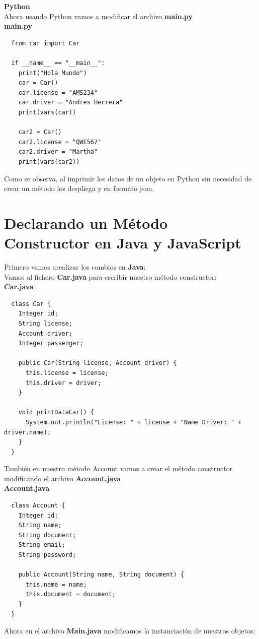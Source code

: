 \documentclass{article}
\begin{document}
\textbf{Python}\\
Ahora usando Python vamos a modificar el archivo \textbf{main.py}\\

\textbf{main.py}
\begin{verbatim}
  from car import Car

  if __name__ == "__main__":
    print("Hola Mundo")
    car = Car()
    car.license = "AMS234"
    car.driver = "Andres Herrera"
    print(vars(car))

    car2 = Car()
    car2.license = "QWE567"
    car2.driver = "Martha"
    print(vars(car2))
\end{verbatim}
Como se observa, al imprimir los datos de un objeto en Python sin necesidad de
crear un método los despliega y en formato json.


\section{Declarando un Método Constructor en Java y JavaScript}%
Primero vamos arealizar los cambios en \textbf{Java}:\\
Vamos al fichero \textbf{Car.java} para escribir nuestro método constructor:\\

\textbf{Car.java}
\begin{verbatim}
  class Car {
    Integer id;
    String license;
    Account driver;
    Integer passenger;

    public Car(String license, Account driver) {
      this.license = license;
      this.driver = driver;
    }

    void printDataCar() {
      System.out.println("License: " + license + "Name Driver: " + driver.name);
    }
  }
\end{verbatim}

También en nuestro método Account vamos a crear el método constructor
modificando el archivo \textbf{Account.java}\\

\textbf{Account.java}
\begin{verbatim}
  class Account {
    Integer id;
    String name;
    String document;
    String email;
    String password;

    public Account(String name, String document) {
      this.name = name;
      this.document = document;
    }
  }
\end{verbatim}


Ahora en el archivo \textbf{Main.java} modificamos la instanciación de nuestros
objetos:\\
\end{document}
